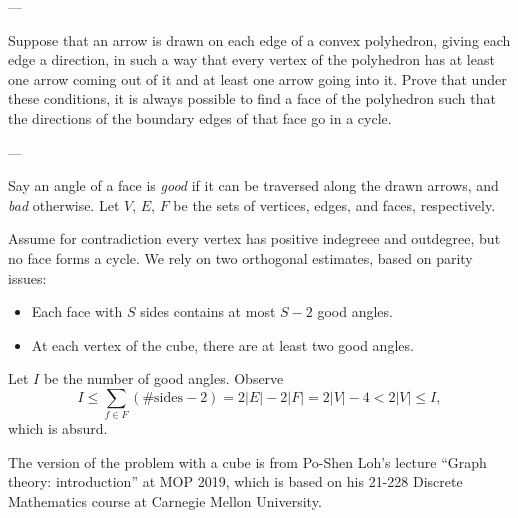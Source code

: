 
---

Suppose that an arrow is drawn on each edge of a convex polyhedron, giving each edge a direction, in such a way that every vertex of the polyhedron has at least one arrow coming out of it and at least one arrow going into it. Prove that under these conditions, it is always possible to find a face of the polyhedron such that the directions of the boundary edges of that face go in a cycle.

---

Say an angle of a face is \emph{good} if it can be traversed along the drawn arrows, and \emph{bad} otherwise. Let $V$, $E$, $F$ be the sets of vertices, edges, and faces, respectively.

Assume for contradiction every vertex has positive indegreee and outdegree, but no face forms a cycle. We rely on two orthogonal estimates, based on parity issues:
\begin{itemize}[itemsep=0em]
    \item Each face with $S$ sides contains at most $S-2$ good angles.
    \item At each vertex of the cube, there are at least two good angles.
\end{itemize}
Let $I$ be the number of good angles. Observe \[I\le\sum_{f\in F}(\text{\# sides}-2)=2|E|-2|F|=2|V|-4<2|V|\le I,\]
which is absurd.
\begin{boxremark}
    The version of the problem with a cube is from Po-Shen Loh's lecture ``Graph theory: introduction'' at MOP 2019, which is based on his 21-228 Discrete Mathematics course at Carnegie Mellon University.
\end{boxremark}


